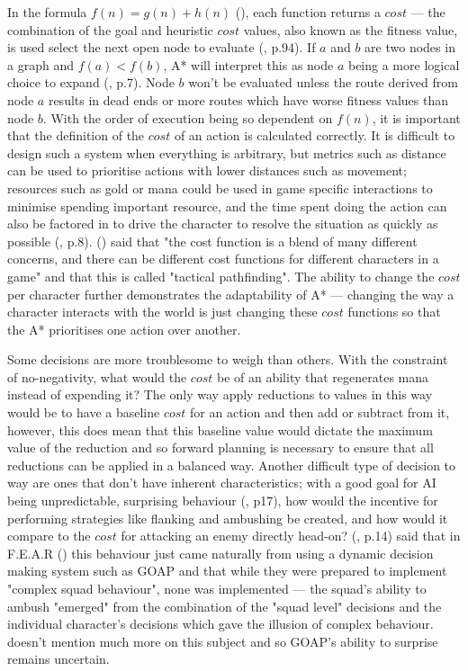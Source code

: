 \documentclass[11pt, a4paper]{article}
\begin{document}
In the formula $f(n) = g(n) + h(n)$ (\cite{hart1968formal}), each function returns a $cost$ --- the combination of the goal and heuristic $cost$ values, also known as the fitness value, is used select the next open node to evaluate (\cite{russell2016artificial}, p.94). If $a$ and $b$ are two nodes in a graph and $f(a) < f(b)$, A* will interpret this as node $a$ being a more logical choice to expand (\cite{orkin2003applying}, p.7). Node $b$ won't be evaluated unless the route derived from node $a$ results in dead ends or more routes which have worse fitness values than node $b$. With the order of execution being so dependent on $f(n)$, it is important that the definition of the $cost$ of an action is calculated correctly. It is difficult to design such a system when everything is arbitrary, but metrics such as distance can be used to prioritise actions with lower distances such as movement; resources such as gold or mana could be used in game specific interactions to minimise spending important resource, and the time spent doing the action can also be factored in to drive the character to resolve the situation as quickly as possible (\cite{lester2005pathfinding}, p.8). \citeauthor{millington2019ai} (\citeyear{millington2019ai}) said that "the cost function is a blend of many different concerns, and there can be different cost functions for different characters in a game" and that this is called "tactical pathfinding". The ability to change the $cost$ per character further demonstrates the adaptability of A* --- changing the way a character interacts with the world is just changing these $cost$ functions so that the A* prioritises one action over another.

Some decisions are more troublesome to weigh than others. With the constraint of no-negativity, what would the $cost$ be of an ability that regenerates mana instead of expending it? The only way apply reductions to values in this way would be to have a baseline $cost$ for an action and then add or subtract from it, however, this does mean that this baseline value would dictate the maximum value of the reduction and so forward planning is necessary to ensure that all reductions can be applied in a balanced way. Another difficult type of decision to way are ones that don't have inherent characteristics; with a good goal for AI being unpredictable, surprising behaviour (\cite{scott2002illusion}, p17), how would the incentive for performing strategies like flanking and ambushing be created, and how would it compare to the $cost$ for attacking an enemy directly head-on? \citeauthor{orkin2006three} (\citeyear{orkin2006three}, p.14) said that in F.E.A.R (\cite{FEAR}) this behaviour just came naturally from using a dynamic decision making system such as GOAP and that while they were prepared to implement "complex squad behaviour", none was implemented --- the squad's ability to ambush "emerged" from the combination of the "squad level" decisions and the individual character's decisions which gave the illusion of complex behaviour. \citeauthor{orkin2006three} doesn't mention much more on this subject and so GOAP's ability to surprise remains uncertain.
\end{document}
